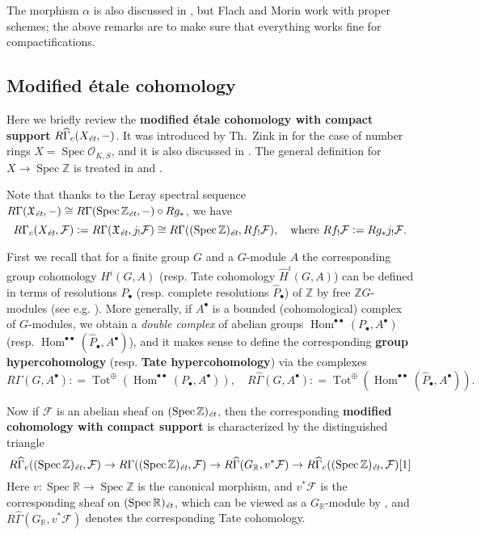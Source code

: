 \documentclass[leqno,12pt]{article}
\theoremstyle{plain}
\theoremstyle{definition}
\DeclareMathOperator{\Spec}{Spec}
\DeclareMathOperator{\Hom}{Hom}
\DeclareMathOperator{\Tot}{Tot}
\newcommand{\RR}{\mathbb{R}}
\newcommand{\ZZ}{\mathbb{Z}}
\newcommand{\dfn}{\mathrel{\mathop:}=}
\newcommand{\et}{\text{\it \'{e}t}}
\begin{document}
The morphism $\alpha$ is also discussed in \cite[Appendix~A]{Flach-Morin-2018},
but Flach and Morin work with proper schemes; the above remarks are to make sure
that everything works fine for compactifications.

\subsection*{Modified \'{e}tale cohomology}

Here we briefly review the
\textbf{modified \'{e}tale cohomology with compact support}
$R\widehat{\Gamma}_c (X_\et, -)$. It was introduced by Th.~Zink in
\cite[Appendix~2]{Haberland-1978} for the case of number rings
$X = \Spec \mathcal{O}_{K,S}$, and it is also discussed in
\cite[\S II.2]{Milne-ADT}. The general definition for $X \to \Spec\ZZ$
is treated in \cite[\S 6.7]{Flach-Morin-2018} and
\cite[\S 2]{Geisser-Schmidt-2018}.

Note that thanks to the Leray spectral sequence
$R\Gamma (\mathfrak{X}_\et, -) \cong R\Gamma (\Spec \ZZ_\et, -)\circ R g_*$,
we have
\begin{equation}
  \label{eqn:RGammac-via-derived-lower-shriek}
  R\Gamma_c (X_\et, \mathcal{F}) \dfn R\Gamma (\mathfrak{X}_\et, j_!\mathcal{F})
  \cong R\Gamma ((\Spec \ZZ)_\et, R f_! \mathcal{F}), \quad
  \text{where } Rf_! \mathcal{F} \dfn R g_* j_! \mathcal{F}.
\end{equation}

First we recall that for a finite group $G$ and a $G$-module $A$ the
corresponding group cohomology $H^i (G,A)$ (resp. Tate cohomology
$\widehat{H}^i (G,A)$) can be defined in terms of resolutions $P_\bullet$
(resp. complete resolutions $\widehat{P}_\bullet$) of $\ZZ$ by free
$\ZZ G$-modules (see e.g. \cite[Chapter~VI]{Brown-1994}). More
generally, if $A^\bullet$ is a bounded (cohomological) complex of
$G$-modules, we obtain a \emph{double complex} of abelian groups
$\Hom^{\bullet\bullet} (P_\bullet, A^\bullet)$ (resp.  $\Hom^{\bullet\bullet}
(\widehat{P}_\bullet, A^\bullet)$), and it makes sense to define the
corresponding \textbf{group hypercohomology}
(resp. \textbf{Tate hypercohomology}) via the complexes
\[ R\Gamma (G, A^\bullet) \dfn
\Tot^\oplus (\Hom^{\bullet\bullet} (P_\bullet, A^\bullet)), \quad
R\widehat{\Gamma} (G, A^\bullet) \dfn
\Tot^\oplus (\Hom^{\bullet\bullet} (\widehat{P}_\bullet, A^\bullet)). \]

Now if $\mathcal{F}$ is an abelian sheaf on $(\Spec \ZZ)_\et$, then the
corresponding \textbf{modified cohomology with compact support} is characterized
by the distinguished triangle
\[ R\widehat{\Gamma}_c ((\Spec \ZZ)_\et, \mathcal{F}) \to
R\Gamma ((\Spec \ZZ)_\et, \mathcal{F}) \to
R\widehat{\Gamma} (G_\RR, v^* \mathcal{F}) \to
R\widehat{\Gamma}_c ((\Spec \ZZ)_\et, \mathcal{F}) [1] \]
Here $v\colon \Spec \RR \to \Spec \ZZ$ is the canonical morphism, and
$v^* \mathcal{F}$ is the corresponding sheaf on $(\Spec \RR)_\et$, which can be
viewed as a $G_\RR$-module by \cite[Expos\'{e}~VII, 2.3]{SGA4}, and
$R\widehat{\Gamma} (G_\RR, v^* \mathcal{F})$ denotes the corresponding Tate
cohomology.
\end{document}
